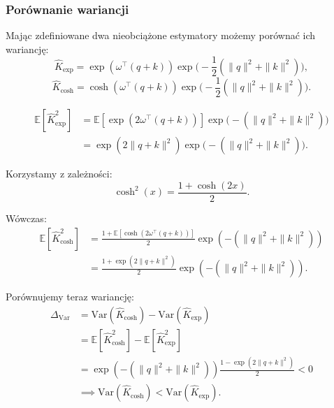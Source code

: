 \documentclass[a4paper,11pt,twoside]{report}
\theoremstyle{definition}
\begin{document}
\subsubsection{Porównanie wariancji}
Mając zdefiniowane dwa nieobciążone estymatory możemy porównać ich wariancję:
\begin{equation}
\hat K_{\mathrm{\exp}} = \exp(\omega^\top (q+k)) \exp\Big(-\frac{1}{2}(\|q\|^2 + \|k\|^2)\Big),
\end{equation}
\begin{equation}
\hat K_{\mathrm{\cosh}} = \cosh(\omega^\top (q+k)) \exp\Big(-\frac{1}{2}(\|q\|^2 + \|k\|^2)\Big).
\end{equation}


\begin{equation}
\begin{aligned}
\mathbb{E}[\hat K_{\mathrm{exp}}^2] &= \mathbb{E}[\exp(2\omega^\top (q+k))]\exp\Big( -(\|q\|^2 + \|k\|^2)\Big)\\
&= \exp(2\|q+k\|^2) \exp\Big(-(\|q\|^2+\|k\|^2)\Big).
\end{aligned}
\end{equation}


Korzystamy z zależności:
\begin{equation}
\cosh^2(x) = \frac{1+\cosh(2x)}{2}.
\end{equation}

Wówczas:
\begin{equation}
\begin{aligned}
\mathbb{E}[\hat K_{\mathrm{\cosh}  }^2] &= \frac{1 + \mathbb{E}[\cosh(2\omega^\top (q+k))]}{2}\exp(-(\|q\|^2+\|k\|^2))\\
&=\frac{1+\exp(2\|q+k\|^2)}{2}\exp(-(\|q\|^2+\|k\|^2)).
\end{aligned}
\end{equation}

Porównujemy teraz wariancję:
\begin{equation}
\begin{aligned}
\Delta_{\mathrm{Var}} &= \mathrm{Var}(\hat K_{\cosh}) - \mathrm{Var}(\hat K_{\mathrm{exp}}) \\ &= \mathbb{E}[\hat K_{\mathrm{\cosh}}^2] - \mathbb{E}[\hat K_{\mathrm{exp}}^2] \\
&= \exp(-(\|q\|^2+\|k\|^2)) \frac{1-\exp(2\|q+k\|^2)}{2} < 0 \\
&\implies \mathrm{Var}(\hat K_{\cosh}) < \mathrm{Var}(\hat K_{\mathrm{exp}}).
\end{aligned}
\end{equation}
\end{document}
